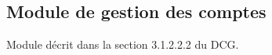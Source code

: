 \documentclass[10pt,a4paper]{report}
\begin{document}
\newpage



\subsection{Module de gestion des comptes}
Module décrit dans la section 3.1.2.2.2 du DCG.
\begin{center}
	\\
\end{center}
\end{document}
